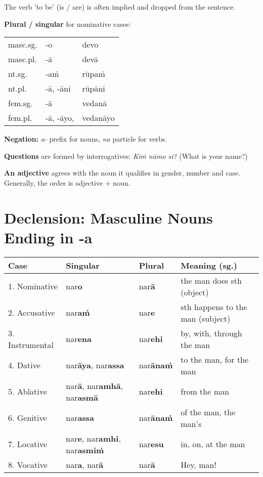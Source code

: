 \documentclass[11pt,oneside]{memoir}
\begin{document}
The verb 'to be' (is / are) is often implied and dropped from the sentence.

\begin{multicols}{2}

\textbf{Plural / singular} for nominative cases:

\begin{center}
\begin{tabular}{lll}
masc.sg. & -o & devo\\[0pt]
masc.pl. & -ā & devā\\[0pt]
\hline
nt.sg. & -aṁ & rūpaṁ\\[0pt]
nt.pl. & -ā, -āni & rūpāni\\[0pt]
\hline
fem.sg. & -ā & vedanā\\[0pt]
fem.pl. & -ā, -āyo, & vedanāyo\\[0pt]
\end{tabular}
\end{center}

\columnbreak

\textbf{Negation:} \emph{a-} prefix for nouns, \emph{na} particle for verbs.

\textbf{Questions} are formed by interrogatives: \emph{Kiṁ nāmo si?} (What is your name?)

\textbf{An adjective} agrees with the noun it qualifies in gender, number and case. Generally, the order is adjective + noun.

\end{multicols}

\section{Declension: Masculine Nouns Ending in -a}
\label{sec:orgb7a3301}

\begin{center}
\begin{tabular}{llll}
Case & Singular & Plural & Meaning (sg.)\\[0pt]
\hline
1. Nominative & nar\textbf{o} & nar\textbf{ā} & the man does sth (object)\\[0pt]
2. Accusative & nar\textbf{aṁ} & nar\textbf{e} & sth happens to the man (subject)\\[0pt]
3. Instrumental & nar\textbf{ena} & nar\textbf{ehi} & by, with, through the man\\[0pt]
4. Dative & nar\textbf{āya}, nar\textbf{assa} & nar\textbf{ānaṁ} & to the man, for the man\\[0pt]
5. Ablative & nar\textbf{ā}, nar\textbf{amhā}, nar\textbf{asmā} & nar\textbf{ehi} & from the man\\[0pt]
6. Genitive & nar\textbf{assa} & nar\textbf{ānaṁ} & of the man, the man's\\[0pt]
7. Locative & nar\textbf{e}, nar\textbf{amhi}, nar\textbf{asmiṁ} & nar\textbf{esu} & in, on, at the man\\[0pt]
8. Vocative & nar\textbf{a}, nar\textbf{ā} & nar\textbf{ā} & Hey, man!\\[0pt]
\end{tabular}
\end{center}
\end{document}
